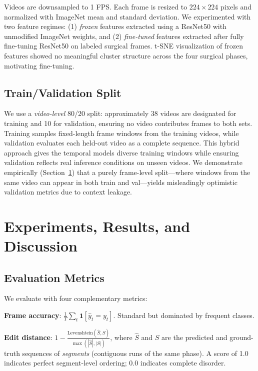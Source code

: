 \documentclass[10pt,twocolumn]{article}
\begin{document}
Videos are downsampled to 1 FPS. Each frame is resized to $224 \times 224$ pixels and normalized with ImageNet mean and standard deviation. We experimented with two feature regimes: (1) \emph{frozen} features extracted using a ResNet50 with unmodified ImageNet weights, and (2) \emph{fine-tuned} features extracted after fully fine-tuning ResNet50 on labeled surgical frames. t-SNE visualization of frozen features showed no meaningful cluster structure across the four surgical phases, motivating fine-tuning.

\subsection{Train/Validation Split}

We use a \emph{video-level} 80/20 split: approximately 38 videos are designated for training and 10 for validation, ensuring no video contributes frames to both sets. Training samples fixed-length frame windows from the training videos, while validation evaluates each held-out video as a complete sequence. This hybrid approach gives the temporal models diverse training windows while ensuring validation reflects real inference conditions on unseen videos. We demonstrate empirically (Section~\ref{sec:experiments}) that a purely frame-level split—where windows from the same video can appear in both train and val—yields misleadingly optimistic validation metrics due to context leakage.

\section{Experiments, Results, and Discussion}
\label{sec:experiments}

\subsection{Evaluation Metrics}

We evaluate with four complementary metrics:

\textbf{Frame accuracy}: $\frac{1}{T}\sum_t \mathbf{1}[\hat{y}_t = y_t]$. Standard but dominated by frequent classes.

\textbf{Edit distance}: $1 - \frac{\text{Levenshtein}(\hat{S}, S)}{\max(|\hat{S}|, |S|)}$, where $\hat{S}$ and $S$ are the predicted and ground-truth sequences of \emph{segments} (contiguous runs of the same phase). A score of 1.0 indicates perfect segment-level ordering; 0.0 indicates complete disorder.
\end{document}

